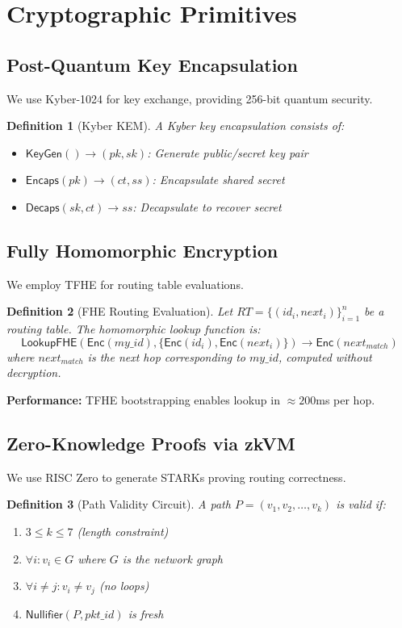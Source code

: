 \documentclass[11pt]{article}
\newtheorem{definition}{Definition}
\begin{document}
\section{Cryptographic Primitives}

\subsection{Post-Quantum Key Encapsulation}

We use Kyber-1024 \cite{kyber} for key exchange, providing 256-bit quantum security.

\begin{definition}[Kyber KEM]
A Kyber key encapsulation consists of:
\begin{itemize}
\item $\mathsf{KeyGen}() \to (pk, sk)$: Generate public/secret key pair
\item $\mathsf{Encaps}(pk) \to (ct, ss)$: Encapsulate shared secret
\item $\mathsf{Decaps}(sk, ct) \to ss$: Decapsulate to recover secret
\end{itemize}
\end{definition}

\subsection{Fully Homomorphic Encryption}

We employ TFHE \cite{tfhe} for routing table evaluations.

\begin{definition}[FHE Routing Evaluation]
Let $RT = \{(id_i, next_i)\}_{i=1}^{n}$ be a routing table. The homomorphic lookup function is:
$$\mathsf{LookupFHE}(\mathsf{Enc}(my\_id), \{\mathsf{Enc}(id_i), \mathsf{Enc}(next_i)\}) \to \mathsf{Enc}(next_{match})$$
where $next_{match}$ is the next hop corresponding to $my\_id$, computed without decryption.
\end{definition}

\textbf{Performance:} TFHE bootstrapping enables lookup in $\approx 200$ms per hop.

\subsection{Zero-Knowledge Proofs via zkVM}

We use RISC Zero \cite{risc0} to generate STARKs proving routing correctness.

\begin{definition}[Path Validity Circuit]
A path $P = (v_1, v_2, \ldots, v_k)$ is valid if:
\begin{enumerate}
\item $3 \leq k \leq 7$ (length constraint)
\item $\forall i: v_i \in G$ where $G$ is the network graph
\item $\forall i \neq j: v_i \neq v_j$ (no loops)
\item $\mathsf{Nullifier}(P, pkt\_id)$ is fresh
\end{enumerate}
\end{definition}
\end{document}
